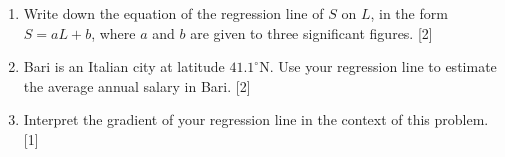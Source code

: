 \documentclass[12pt, twoside]{article}
\begin{document}
\begin{enumerate}[itemsep=0.1cm]
\begin{enumerate}[itemsep=0.25cm]
  \begin{quote}
    $0 \le |r| < 0.4$: weak, \quad
    $0.4 \le |r| < 0.8$: moderate, \quad
    $0.8 \le |r| \le 1$: strong.
  \end{quote}

  \vspace{0.6cm}

  \item Write down the equation of the regression line of $S$ on $L$, in the
  form $S = aL + b$, where $a$ and $b$ are given to three significant figures.
  \hfill [2]

  \vspace{2cm}

  \item Bari is an Italian city at latitude $41.1^\circ$N. Use your regression
  line to estimate the average annual salary in Bari. \hfill [2]

  \vspace{2cm}

  \item Interpret the gradient of your regression line in the context of
  this problem. \hfill [1]

  \vspace{2cm}

\end{enumerate}

\end{enumerate}
\end{document}

